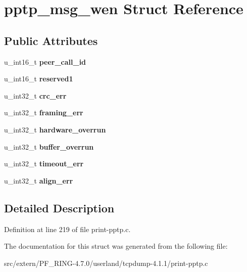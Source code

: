 \hypertarget{structpptp__msg__wen}{
\section{pptp\_\-msg\_\-wen Struct Reference}
\label{structpptp__msg__wen}
}
\subsection*{Public Attributes}
\begin{DoxyCompactItemize}
\item 
\hypertarget{structpptp__msg__wen_a3b3ad21d5b9e912cb2ae36eb5f73ef7c}{
u\_\-int16\_\-t {\bfseries peer\_\-call\_\-id}}
\label{structpptp__msg__wen_a3b3ad21d5b9e912cb2ae36eb5f73ef7c}

\item 
\hypertarget{structpptp__msg__wen_aab104e347228e28ad5f8754cddba4498}{
u\_\-int16\_\-t {\bfseries reserved1}}
\label{structpptp__msg__wen_aab104e347228e28ad5f8754cddba4498}

\item 
\hypertarget{structpptp__msg__wen_ab5ef97df5648cf471fd9419f8a63823b}{
u\_\-int32\_\-t {\bfseries crc\_\-err}}
\label{structpptp__msg__wen_ab5ef97df5648cf471fd9419f8a63823b}

\item 
\hypertarget{structpptp__msg__wen_a22783369114e47ef20e4b7306a1260af}{
u\_\-int32\_\-t {\bfseries framing\_\-err}}
\label{structpptp__msg__wen_a22783369114e47ef20e4b7306a1260af}

\item 
\hypertarget{structpptp__msg__wen_aa01198a9d48161e0883928cfdaa15755}{
u\_\-int32\_\-t {\bfseries hardware\_\-overrun}}
\label{structpptp__msg__wen_aa01198a9d48161e0883928cfdaa15755}

\item 
\hypertarget{structpptp__msg__wen_a02ae37465dc33ee80aeaffa917486af5}{
u\_\-int32\_\-t {\bfseries buffer\_\-overrun}}
\label{structpptp__msg__wen_a02ae37465dc33ee80aeaffa917486af5}

\item 
\hypertarget{structpptp__msg__wen_ae5041a6c75d88f88fa19b9fe8da10c1f}{
u\_\-int32\_\-t {\bfseries timeout\_\-err}}
\label{structpptp__msg__wen_ae5041a6c75d88f88fa19b9fe8da10c1f}

\item 
\hypertarget{structpptp__msg__wen_a7eb349e19e2eb3b7ef40b16115881b8d}{
u\_\-int32\_\-t {\bfseries align\_\-err}}
\label{structpptp__msg__wen_a7eb349e19e2eb3b7ef40b16115881b8d}

\end{DoxyCompactItemize}


\subsection{Detailed Description}


Definition at line 219 of file print-\/pptp.c.



The documentation for this struct was generated from the following file:\begin{DoxyCompactItemize}
\item 
src/extern/PF\_\-RING-\/4.7.0/userland/tcpdump-\/4.1.1/print-\/pptp.c\end{DoxyCompactItemize}
